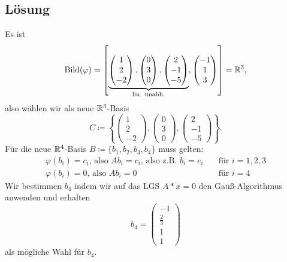 \subsection{Lösung}
Es ist 
\begin{equation*}
	\text{Bild}(\varphi) = \left [ \underbrace{\begin{pmatrix}
		1 \\ 2 \\ -2
	\end{pmatrix}, \begin{pmatrix}
		0 \\ 3 \\ 0
	\end{pmatrix}, \begin{pmatrix}
		2 \\ -1 \\ -5
	\end{pmatrix}}_{\text{lin. unabh.}}, \begin{pmatrix}
		-1 \\ 1 \\ 3
	\end{pmatrix} \right ] = \mathbb{R}^3\text{,}
\end{equation*}
also wählen wir als neue \( \mathbb{R}^3 \)-Basis
\begin{equation*}
	C \coloneqq \left \{ \begin{pmatrix}
		1 \\ 2 \\ -2
	\end{pmatrix}, \begin{pmatrix}
		0 \\ 3 \\ 0
	\end{pmatrix}, \begin{pmatrix}
		2 \\ -1 \\ -5
	\end{pmatrix} \right \}\text{.}
\end{equation*}
Für die neue \( \mathbb{R}^4 \)-Basis \( B \coloneqq \{ b_1, b_2, b_3, b_4 \} \) muss gelten:
\begin{align*}
	\varphi(b_i) = c_i\text{, also } Ab_i = c_i\text{, also z.B. } b_i = e_i &\quad \text{für } i = 1,2,3 \\
	\varphi(b_i) = 0\text{, also } Ab_i = 0 &\quad \text{für } i = 4  
\end{align*}
Wir bestimmen \( b_4 \) indem wir auf das LGS \( A*x = 0 \) den Gauß-Algorithmus anwenden und erhalten
\begin{equation*}
	b_4 = \begin{pmatrix}
	-1 \\ \tfrac{2}{3} \\ 1 \\ 1
\end{pmatrix}
\end{equation*}
als mögliche Wahl für \( b_4 \).

